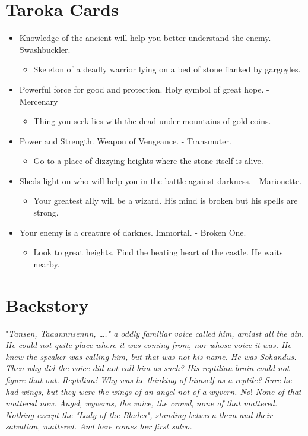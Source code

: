 \documentclass[11pt]{article}
\begin{document}
\section{Taroka Cards}
\label{sec:org5aa39e1}

\begin{itemize}
\item Knowledge of the ancient will help you better understand the enemy. -
Swashbuckler.
\begin{itemize}
\item Skeleton of a deadly warrior lying on a bed of stone flanked by gargoyles.
\end{itemize}
\item Powerful force for good and protection. Holy symbol of great hope. - Mercenary
\begin{itemize}
\item Thing you seek lies with the dead under mountains of gold coins.
\end{itemize}
\item Power and Strength. Weapon of Vengeance. - Transmuter.
\begin{itemize}
\item Go to a place of dizzying heights where the stone itself is alive.
\end{itemize}
\item Sheds light on who will help you in the battle against darkness. - Marionette.
\begin{itemize}
\item Your greatest ally will be a wizard. His mind is broken but his spells are
strong.
\end{itemize}
\item Your enemy is a creature of darknes. Immortal. - Broken One.
\begin{itemize}
\item Look to great heights. Find the beating heart of the castle. He waits
nearby.
\end{itemize}
\end{itemize}

\section{Backstory}
\label{sec:orgd5d7de3}

"\emph{Tansen, Taaannnsennn, \ldots{}." a oddly familiar voice called him, amidst all the}
\emph{din. He could not quite place where it was coming from, nor whose voice it}
\emph{was. He knew the speaker was calling him, but that was not his name. He was}
\emph{Sohandus. Then why did the voice did not call him as such? His reptilian brain}
\emph{could not figure that out. Reptilian! Why was he thinking of himself as a}
\emph{reptile? Sure he had wings, but they were the wings of an angel not of a}
\emph{wyvern. No}! \emph{None of that mattered now. Angel, wyverns, the voice, the crowd},
\emph{none of that mattered. Nothing except the "Lady of the Blades", standing between}
\emph{them and their salvation, mattered. And here comes her first salvo.}
\end{document}
